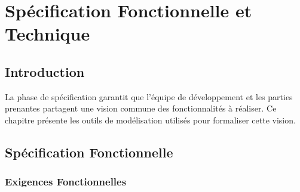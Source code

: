 \chapter{Spécification Fonctionnelle et Technique}


\section{Introduction}

La phase de spécification garantit que l'équipe de développement et les parties
prenantes partagent une vision commune des fonctionnalités à réaliser. Ce chapitre
présente les outils de modélisation utilisés pour formaliser cette vision.

\section{Spécification Fonctionnelle}

\subsection{Exigences Fonctionnelles}

